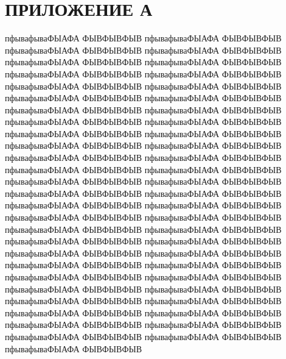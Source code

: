 \chapter{ПРИЛОЖЕНИЕ А}
\label{cha:appendix1}

пфывафываФЫАФА ФЫВФЫВФЫВ пфывафываФЫАФА ФЫВФЫВФЫВ пфывафываФЫАФА ФЫВФЫВФЫВ пфывафываФЫАФА ФЫВФЫВФЫВ пфывафываФЫАФА ФЫВФЫВФЫВ пфывафываФЫАФА ФЫВФЫВФЫВ пфывафываФЫАФА ФЫВФЫВФЫВ пфывафываФЫАФА ФЫВФЫВФЫВ пфывафываФЫАФА ФЫВФЫВФЫВ пфывафываФЫАФА ФЫВФЫВФЫВ пфывафываФЫАФА ФЫВФЫВФЫВ пфывафываФЫАФА ФЫВФЫВФЫВ пфывафываФЫАФА ФЫВФЫВФЫВ пфывафываФЫАФА ФЫВФЫВФЫВ пфывафываФЫАФА ФЫВФЫВФЫВ пфывафываФЫАФА ФЫВФЫВФЫВ пфывафываФЫАФА ФЫВФЫВФЫВ пфывафываФЫАФА ФЫВФЫВФЫВ пфывафываФЫАФА ФЫВФЫВФЫВ пфывафываФЫАФА ФЫВФЫВФЫВ пфывафываФЫАФА ФЫВФЫВФЫВ пфывафываФЫАФА ФЫВФЫВФЫВ пфывафываФЫАФА ФЫВФЫВФЫВ пфывафываФЫАФА ФЫВФЫВФЫВ пфывафываФЫАФА ФЫВФЫВФЫВ пфывафываФЫАФА ФЫВФЫВФЫВ пфывафываФЫАФА ФЫВФЫВФЫВ пфывафываФЫАФА ФЫВФЫВФЫВ пфывафываФЫАФА ФЫВФЫВФЫВ пфывафываФЫАФА ФЫВФЫВФЫВ пфывафываФЫАФА ФЫВФЫВФЫВ пфывафываФЫАФА ФЫВФЫВФЫВ пфывафываФЫАФА ФЫВФЫВФЫВ пфывафываФЫАФА ФЫВФЫВФЫВ пфывафываФЫАФА ФЫВФЫВФЫВ пфывафываФЫАФА ФЫВФЫВФЫВ пфывафываФЫАФА ФЫВФЫВФЫВ пфывафываФЫАФА ФЫВФЫВФЫВ пфывафываФЫАФА ФЫВФЫВФЫВ пфывафываФЫАФА ФЫВФЫВФЫВ пфывафываФЫАФА ФЫВФЫВФЫВ пфывафываФЫАФА ФЫВФЫВФЫВ пфывафываФЫАФА ФЫВФЫВФЫВ пфывафываФЫАФА ФЫВФЫВФЫВ пфывафываФЫАФА ФЫВФЫВФЫВ пфывафываФЫАФА ФЫВФЫВФЫВ пфывафываФЫАФА ФЫВФЫВФЫВ пфывафываФЫАФА ФЫВФЫВФЫВ пфывафываФЫАФА ФЫВФЫВФЫВ пфывафываФЫАФА ФЫВФЫВФЫВ пфывафываФЫАФА ФЫВФЫВФЫВ пфывафываФЫАФА ФЫВФЫВФЫВ пфывафываФЫАФА ФЫВФЫВФЫВ 

